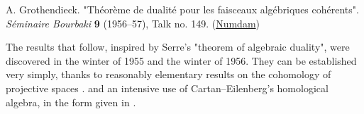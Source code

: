 
A. Grothendieck.
"Théorème de dualité pour les faisceaux algébriques cohérents".
\emph{Séminaire Bourbaki} \textbf{9} (1956–57), Talk no. 149.
(\href{http://www.numdam.org/book-part/SB_1956-1958__4__169_0/}{Numdam})


The results that follow, inspired by Serre's "theorem of algebraic duality", were discovered in the winter of 1955 and the winter of 1956.
They can be established very simply, thanks to reasonably elementary results on the cohomology of projective spaces \cite{Ser1955}. and an intensive use of Cartan–Eilenberg's homological algebra, in the form given in \cite{Gro1957}.
